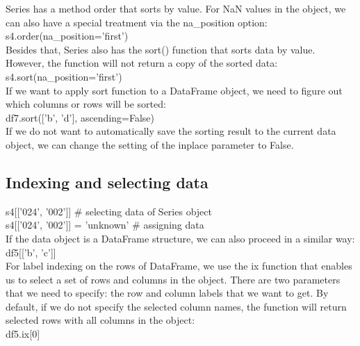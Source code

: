 \documentclass{article}
\numberwithin{equation}{section} %
\begin{document}
Series has a method order that sorts by value. For NaN values in the object, we can
also have a special treatment via the na\_position option:\\

s4.order(na\_position='first')\\

Besides that, Series also has the sort() function that sorts data by value. However,
the function will not return a copy of the sorted data:\\

s4.sort(na\_position='first')\\

If we want to apply sort function to a DataFrame object, we need to figure out which
columns or rows will be sorted:\\

df7.sort(['b', 'd'], ascending=False)\\

If we do not want to automatically save the sorting result to the current data object,
we can change the setting of the inplace parameter to False.\\

\subsection*{Indexing and selecting data}

s4[['024', '002']]	\hspace{2cm}	\# selecting data of Series object\\

s4[['024', '002']] = 'unknown' 	\hspace{2cm}	\# assigning data \\

If the data object is a DataFrame structure, we can also proceed in a similar way:\\

df5[['b', 'c']] \\

For label indexing on the rows of DataFrame, we use the ix function that enables us
to select a set of rows and columns in the object. There are two parameters that we
need to specify: the row and column labels that we want to get. By default, if we do
not specify the selected column names, the function will return selected rows with all
columns in the object:\\

df5.ix[0] \\
\end{document}
